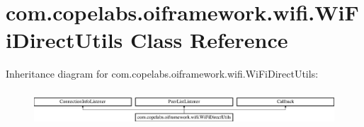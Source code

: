 \hypertarget{classcom_1_1copelabs_1_1oiframework_1_1wifi_1_1_wi_fi_direct_utils}{}\section{com.\+copelabs.\+oiframework.\+wifi.\+Wi\+Fi\+Direct\+Utils Class Reference}
\label{classcom_1_1copelabs_1_1oiframework_1_1wifi_1_1_wi_fi_direct_utils}
Inheritance diagram for com.\+copelabs.\+oiframework.\+wifi.\+Wi\+Fi\+Direct\+Utils\+:\begin{figure}[H]
\begin{center}
\leavevmode
\includegraphics[height=1.333333cm]{classcom_1_1copelabs_1_1oiframework_1_1wifi_1_1_wi_fi_direct_utils}
\end{center}
\end{figure}
